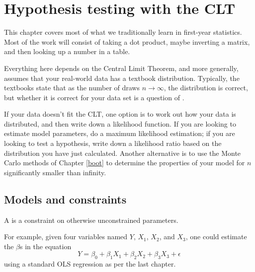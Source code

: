 \startonecol \chapter[Gaussian tricks]{Hypothesis testing with the CLT} \label{testing} \label{gauss} \endonecol

This chapter covers most of what we traditionally learn in first-year statistics. 
 Most of the work will consist of taking a dot product, maybe inverting a matrix,
and then looking up a number in a table. 

Everything here depends on the Central Limit Theorem, and more
generally, assumes that your real-world data has a textbook
distribution. Typically, the textbooks state that as the number of draws
$n \to \infty$, the distribution is correct, but whether it is correct
for your data set is a question of .

If your data doesn't fit the CLT, one option is to work out how your
data is distributed, 
and then write down a likelihood function. If you are
looking to estimate model parameters, do a maximum likelihood estimation;
if you are looking to test a hypothesis, write down a likelihood ratio
based on the distribution you have just calculated.
Another alternative is to use the Monte Carlo methods of 
Chapter \ref{boot} to determine the properties of your model for $n$ 
significantly smaller than infinity.


\section{Models and constraints} A  is a constraint
on otherwise unconstrained parameters. 

For example, given four variables named $Y$, $X_1$, $X_2$, and $X_3$,
one could estimate the $\beta$s in the equation
\begin{equation*}
Y = \beta_0 + \beta_1 X_1 + \beta_2 X_2 + \beta_3 X_3 + \epsilon
\end{equation*}
using a standard OLS regression as per the last chapter.

